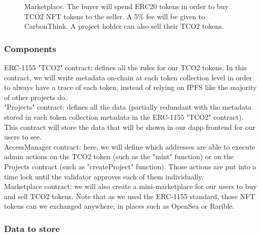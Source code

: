 \documentclass[a4paper, 12pt]{article}
\begin{document}
\begin{figure}[H]
    \centering
    \caption{Marketplace. The buyer will spend ERC20 tokens in order to buy TCO2 NFT tokens to the seller. A 5\% fee will be given to CarbonThink. A project holder can also sell their TCO2 tokens.}
    \label{fig:marketplace-fees}
\end{figure}

\subsubsection{Components}

ERC-1155 "TCO2" contract: defines all the rules for our TCO2 tokens. In this contract, we will write metadata on-chain at each token collection level in order to always have a trace of each token, instead of relying on IPFS like the majority of other projects do.\\

"Projects" contract: defines all the data (partially redundant with the metadata stored in each token collection metadata in the ERC-1155 "TCO2" contract). This contract will store the data that will be shown in our dapp frontend for our users to see.\\

AccessManager contract: here, we will define which addresses are able to execute admin actions on the TCO2 token (such as the "mint" function) or on the Projects contract (such as "createProject" function). Those actions are put into a time lock until the validator approves each of them individually.\\

Marketplace contract: we will also create a mini-marketplace for our users to buy and sell TCO2 tokens. Note that as we used the ERC-1155 standard, those NFT tokens can we exchanged anywhere, in places such as OpenSea or Rarible.

\subsubsection{Data to store}
\end{document}

